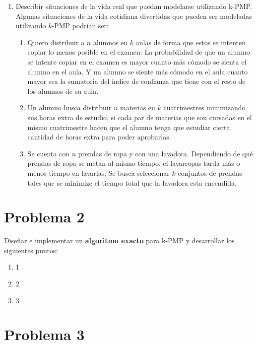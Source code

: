 \documentclass[11pt, a4paper, twoside]{article}
\begin{document}
\begin{enumerate}
		      
			\item Describir situaciones de la vida real que puedan modelarse utilizando k-PMP.
			Algunas situaciones de la vida cotidiana divertidas que pueden ser modeladas utilizando
			$k$-PMP podrían ser:
				  \begin{enumerate}
					\item Quiero distribuir a $n$ alumnos en $k$ aulas de forma que estos se intenten
					copiar lo menos posible en el examen: La probabilidad de que un alumno se intente
					copiar en el examen es mayor cuanto más cómodo se sienta el alumno en el aula. 
					Y un alumno
					se siente más cómodo en el aula cuanto mayor sea la sumatoria del índice de 
					confianza que tiene con el resto de los alumnos de su aula.
					
					\item Un alumno busca distribuir $n$ materias en $k$ cuatrimestres minimizando
					sus horas extra de estudio, si cada par de materias que son cursadas en el mismo
					cuatrimestre hacen que el alumno tenga que estudiar cierta cantidad de horas extra
					para poder aprobarlas.
					
					\item Se cuenta con $n$ prendas de ropa y con una lavadora. Dependiendo de qué prendas
					de ropa se metan al mismo tiempo, el lavarropas tarda más o menos tiempo en lavarlas. Se busca 
					seleccionar $k$ conjuntos de prendas tales que se minimize el tiempo total que la 
					lavadora esta encendida.
				  \end{enumerate}
			\end{enumerate}
	


\newpage
\section{Problema 2}
	Diseñar e implementar un \textbf{algoritmo exacto} para k-PMP y desarrollar los siguientes puntos:
	\begin{enumerate}
	
		\item 1
		\item 2
		\item 3
	\end{enumerate}	
			
			
\newpage
\section{Problema 3}
    
\end{document}
